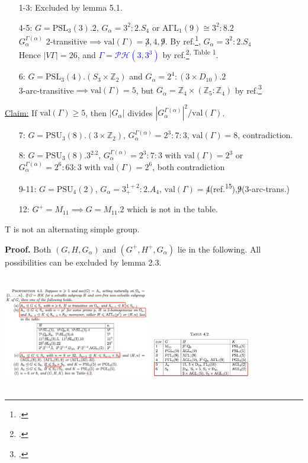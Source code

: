 \documentclass{beamer}
\def\PSL{\mathrm{PSL}}
\def\PSU{\mathrm{PSU}}
\def\AGaL{\mathrm{A\Gamma L}}
\def\val{\mathrm{val}}
\def\PH{\mathcal{PH}}
\begin{document}
\begin{frame}
\begin{itemize}
	\item[1-3:] Excluded by lemma 5.1.
	\item[4-5:] $G=\PSL_3(3).2$, $G_\alpha=3^2:2.S_4$ or $\AGaL_1(9)\cong 3^2:8.2$\\  $G_\alpha^{\Gamma(\alpha)}$ 2-transitive$\implies \val(\Gamma)=\not 3,4,\not 9$. By ref.\footcite{LI2006164}, $G_\alpha=3^2:2.S_4$\\Hence $|V\Gamma|=26$, and \textcolor{blue}{$\Gamma=\PH(3,3^3)$} by ref.\footcite{CHENG1987196}\textsuperscript{, Table 1}.
	\item[6:] $G=\PSL_3(4).(S_3\times\mathbb{Z}_2)$ and $G_\alpha=2^4:(3\times D_{10}).2$\\3-arc-transitive$\implies \val(\Gamma)=5$, but $G_\alpha=\mathbb{Z}_4\times(\mathbb{Z}_5:\mathbb{Z}_4)$ by ref.\footcite{weiss_1979}
\end{itemize}
\underline{Claim:} If $\val(\Gamma)\geq 5$, then $|G_\alpha|$ divides $|G_\alpha^{\Gamma(\alpha)}|^2/\val(\Gamma)$.
\begin{itemize}
	\item[7:] $G=\PSU_3(8).(3\times \mathbb{Z}_2)$, $G_\alpha^{\Gamma(\alpha)}=2^3:7:3$, $\val(\Gamma)=8$, contradiction.
	\item[8:] $G=\PSU_3(8).3^2.2$, $G_\alpha^{\Gamma(\alpha)}=2^3:7:3$ with $\val(\Gamma)=2^3$ or $G_\alpha^{\Gamma(\alpha)}=2^6:63:3$ with $\val(\Gamma)=2^6$, both contradiction
	\item[9-11:] $G=\PSU_4(2)$, $G_\alpha=3^{1+2}_+:2.A_4$, $\val(\Gamma)=\not 4$(ref.\textsuperscript{15}),$\not 9$(3-arc-trans.)
	\item[12:] $G^+=M_{11}\implies G=M_{11}.2$ which is not in the table.
\end{itemize}
\end{frame}

\begin{frame}
\begin{lemma}[5.3]
T is not an alternating simple group.
\end{lemma}
\textbf{Proof. }Both $(G,H,G_\alpha)$ and $(G^+,H^+,G_\alpha)$ lie in the following. All possibilities can be excluded by lemma 2.3.

\includegraphics[width=6.5cm,height=5cm]{alternating.jpg}
\includegraphics[width=4.3cm,height=3cm]{tab4.2.jpg}
\end{frame}
\end{document}
